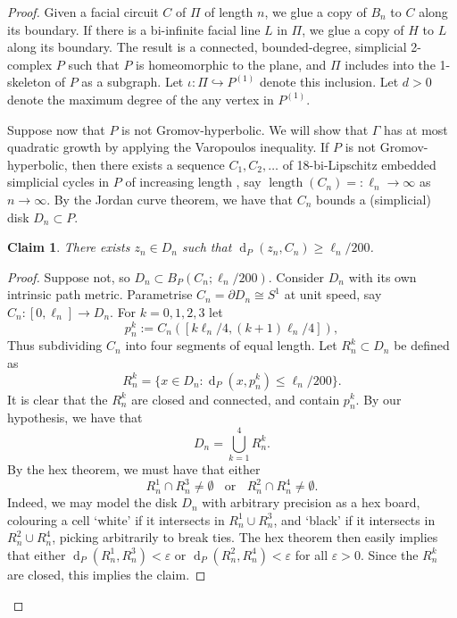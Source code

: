 \documentclass[11pt,a4paper]{amsart}
\DeclareMathOperator{\length}{length}
\DeclareMathOperator{\dist}{d}
\newcommand{\into}{\hookrightarrow}
\newtheorem{claim}[theorem]{Claim}
\theoremstyle{definition}
\begin{document}
\begin{proof}
    Given a facial circuit $C$ of $\Pi$ of length $n$, we glue a copy of $B_n$ to $C$ along its boundary.
    If there is a bi-infinite facial line $L$ in $\Pi$, we glue a copy of $H$ to $L$ along its boundary. The result is a connected, bounded-degree, simplicial 2-complex $P$ such that $P$ is homeomorphic to the plane, and $\Pi$ includes into the 1-skeleton of $P$ as a subgraph. Let $\iota : \Pi \into P^{(1)}$ denote this inclusion. Let $d > 0$ denote the maximum degree of the any vertex in $P^{(1)}$. 

    Suppose now that $P$ is not Gromov-hyperbolic. We will show that $\Gamma$ has at most quadratic growth by applying the Varopoulos inequality.
    If $P$ is not Gromov-hyperbolic, then there exists a sequence 
        $
        C_1, C_2, \ldots
        $
        of 18-bi-Lipschitz embedded simplicial cycles in $P$ of increasing length \cite[Prop.~5.1]{hume2020poorly}, say 
        $
        \length(C_n) =: \ell_n \to \infty
        $ 
        as $n \to \infty$. 
        By the Jordan curve theorem, we have that $C_n$ bounds a (simplicial) disk $D_n \subset P$.

        \begin{claim}\label{claim:linear-filling-diameter}
            There exists $z_n \in D_n$ such that $\dist_P(z_n, C_n) \geq \ell_n /200$. 
        \end{claim}

        \begin{proof}
            Suppose not, so $D_n \subset B_P(C_n;\ell_n/200)$. Consider $D_n$ with its own intrinsic path metric. Parametrise $C_n = \partial D_n \cong S^1$ at unit speed, say $C_n : [0,\ell_n] \to D_n$. For $k=0,1,2,3$ let 
            $$
            p_{n}^k := C_n([k\ell_n/4, (k+1)\ell_n/4]),
            $$
            Thus subdividing $C_n$ into four segments of equal length.
            Let $R_n^k \subset D_n$ be defined as
            $$
            R_n^k = \{x \in D_n : \dist_{P}(x, p_n^k) \leq \ell_n/200 \}. 
            $$
            It is clear that the $R_n^k$ are closed and connected, and contain $p_n^k$. 
            By our hypothesis, we have that 
            $$
            D_n = \bigcup _{k=1}^4 R_n^k.
            $$
            By the hex theorem, we must have that either 
            $$
            R_n^1 \cap R_n^3 \neq \emptyset  \ \ \ \  \text{or} \ \ \ \ R_n^2 \cap R_n^4 \neq \emptyset.
            $$
            Indeed, we may model the disk $D_n$ with arbitrary precision as a hex board, colouring a cell `white' if it intersects  in $R_n^1 \cup R_n^3$, and `black' if it intersects  in $R_n^2 \cup R_n^4$, picking arbitrarily to break ties. The hex theorem then easily implies that either $\dist_P(R_n^1, R_n^3) < \varepsilon$ or $\dist_P(R_n^2,R_n^4) < \varepsilon$ for all $\varepsilon > 0$. Since the $R_n^k$ are closed, this implies the claim. 
            

\end{proof}
\end{proof}
\end{document}
